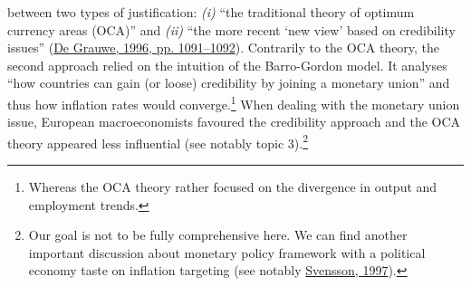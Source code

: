 \documentclass[
]{article}
\begin{document}
between two types of justification: \emph{(i)} ``the traditional theory
of optimum currency areas (OCA)'' and \emph{(ii)} ``the more recent `new
view' based on credibility issues''
(\protect\hyperlink{ref-degrauwe1996}{De Grauwe, 1996, pp. 1091--1092}).
Contrarily to the OCA theory, the second approach relied on the
intuition of the Barro-Gordon model. It analyses ``how countries can
gain (or loose) credibility by joining a monetary union'' and thus how
inflation rates would converge.\footnote{Whereas the OCA theory rather
  focused on the divergence in output and employment trends.} When
dealing with the monetary union issue, European macroeconomists favoured
the credibility approach and the OCA theory appeared less influential
(see notably topic 3).\footnote{Our goal is not to be fully
  comprehensive here. We can find another important discussion about
  monetary policy framework with a political economy taste on inflation
  targeting (see notably \protect\hyperlink{ref-svensson1997}{Svensson,
  1997}).}
\end{document}
